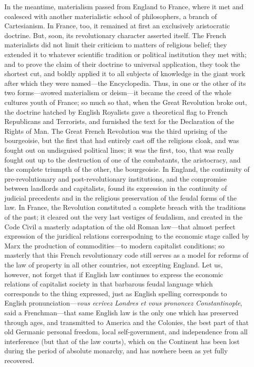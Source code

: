In the meantime, materialism passed from England to France, where it met and
coalesced with another materialistic school of philosophers, a branch of
Cartesianism. In France, too, it remained at first an exclusively aristocratic
doctrine. But, soon, its revolutionary character asserted itself. The French
materialists did not limit their criticism to matters of religious belief; they
extended it to whatever scientific tradition or political institution they met
with; and to prove the claim of their doctrine to universal application, they
took the shortest cut, and boldly applied it to all subjects of knowledge in the
giant work after which they were named---the Encyclopedia. Thus, in one or the
other of its two forms---avowed materialism or deism---it became the creed of
the whole cultures youth of France; so much so that, when the Great Revolution
broke out, the doctrine hatched by English Royalists gave a theoretical flag to
French Republicans and Terrorists, and furnished the text for the Declaration of
the Rights of Man. The Great French Revolution was the third uprising of the
bourgeoisie, but the first that had entirely cast off the religious cloak, and
was fought out on undisguised political lines; it was the first, too, that was
really fought out up to the destruction of one of the combatants, the
aristocracy, and the complete triumpth of the other, the bourgeoisie. In
England, the continuity of pre-revolutionary and post-revolutionary
institutions, and the compromise between landlords and capitalists, found its
expression in the continuity of judicial precedents and in the religious
preservation of the feudal forms of the law. In France, the Revolution
constituted a complete breach with the traditions of the past; it cleared out
the very last vestiges of feudalism, and created in the Code Civil a masterly
adaptation of the old Roman law---that almost perfect expression of the
juridical relations correspodning to the economic stage called by Marx the
production of commodities---to modern capitalist conditions; so masterly that
this French revolutionary code still serves as a model for reforms of the law of
property in all other countries, not excepting England. Let us, however, not
forget that if English law continues to express the economic relations of
capitalist society in that barbarous feudal language which corresponds to the
thing expressed, just as English spelling corresponds to English
pronunciation---\emph{vous ecrivez Londres et vous prononcez Constantinople},
said a Frenchman---that same English law is the only one which has preserved
through ages, and transmitted to America and the Colonies, the best part of that
old Germanic personal freedom, local self-government, and independence from all
interference (but that of the law courts), which on the Continent has been lost
during the period of absolute monarchy, and has nowhere been as yet fully
recovered.

